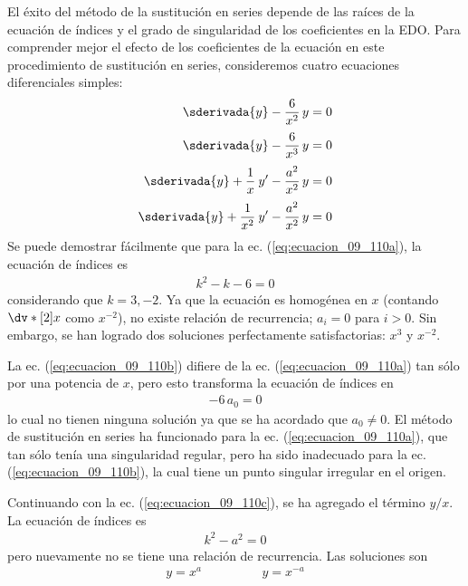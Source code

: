 El éxito del método de la sustitución en series depende de las raíces de la ecuación de índices y el grado de singularidad de los coeficientes en la EDO. Para comprender mejor el efecto de los coeficientes de la ecuación en este procedimiento de sustitución en series, consideremos cuatro ecuaciones diferenciales simples:
\begin{subequations}
\begin{align}
\sderivada{y} - \dfrac{6}{x^{2}} \, y &= 0 \label{eq:ecuacion_09_110a} \\[0.25em]
\sderivada{y} - \dfrac{6}{x^{3}} \, y &= 0 \label{eq:ecuacion_09_110b} \\[0.25em]
\sderivada{y} + \dfrac{1}{x} \: y^{\prime} - \dfrac{a^{2}}{x^{2}} \, y &= 0 \label{eq:ecuacion_09_110c} \\[0.25em]
\sderivada{y} + \dfrac{1}{x^{2}} \: y^{\prime} - \dfrac{a^{2}}{x^{2}} \, y &= 0 \label{eq:ecuacion_09_110d}
\end{align}
\end{subequations}
Se puede demostrar fácilmente que para la ec. (\ref{eq:ecuacion_09_110a}), la ecuación de índices es
\begin{align*}
k^{2} - k - 6 = 0
\end{align*}
considerando que $k = 3, -2$. Ya que la ecuación es homogénea en $x$ (contando $\dv*[2]{x}$ como $x^{-2}$), no existe relación de recurrencia; $a_{i} = 0$ para $i > 0$. Sin embargo, se han logrado dos soluciones perfectamente satisfactorias: $x^{3}$ y $x^{-2}$.
\par
La ec. (\ref{eq:ecuacion_09_110b}) difiere de la ec. (\ref{eq:ecuacion_09_110a}) tan sólo por una potencia de $x$, pero esto transforma la ecuación de índices en
\begin{align*}
- 6 \, a_{0} = 0
\end{align*}
lo cual no tienen ninguna solución ya que se ha acordado que $a_{0} \neq 0$. El método de sustitución en series ha funcionado para la ec. (\ref{eq:ecuacion_09_110a}), que tan sólo tenía una singularidad regular, pero ha sido inadecuado para la ec. (\ref{eq:ecuacion_09_110b}), la cual tiene un punto singular irregular en el origen.
\par
Continuando con la ec. (\ref{eq:ecuacion_09_110c}), se ha agregado el término $y/x$. La ecuación de índices es
\begin{align*}
k^{2} - a^{2} = 0
\end{align*}
pero nuevamente no se tiene una relación de recurrencia. Las soluciones son
\begin{align*}
y = x^{a} \hspace{2cm} y = x^{-a}
\end{align*}

